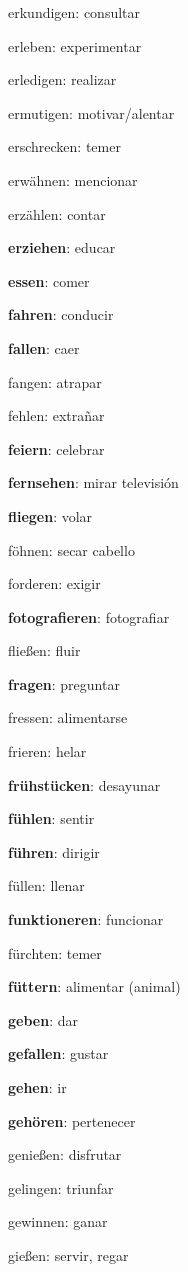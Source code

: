 \begin{multicols}{2}
\begin{myitemize}
\item erkundigen: consultar
\item erleben: experimentar
\item erledigen: realizar
\item ermutigen: motivar/alentar
\item erschrecken: temer
\item erwähnen: mencionar
\item erzählen: contar
\item \textbf{erziehen}: educar
\item \textbf{essen}: comer
\item \textbf{fahren}: conducir
\item \textbf{fallen}: caer
\item fangen: atrapar
\item fehlen: extrañar
\item \textbf{feiern}: celebrar
\item \textbf{fernsehen}: mirar televisión
\item \textbf{fliegen}: volar
\item föhnen: secar cabello
\item forderen: exigir
\item \textbf{fotografieren}: fotografiar
\item fließen: fluir
\item \textbf{fragen}: preguntar
\item fressen: alimentarse
\item frieren: helar
\item \textbf{frühstücken}: desayunar
\item \textbf{fühlen}: sentir
\item \textbf{führen}: dirigir
\item füllen: llenar
\item \textbf{funktioneren}: funcionar
\item fürchten: temer
\item \textbf{füttern}: alimentar (animal)
\item \textbf{geben}: dar
\item \textbf{gefallen}: gustar
\item \textbf{gehen}: ir
\item \textbf{gehören}: pertenecer
\item genießen: disfrutar
\item gelingen: triunfar
\item gewinnen: ganar
\item gießen: servir, regar

\end{myitemize}
\end{multicols}
